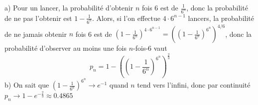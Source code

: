 a) Pour un lancer, la probabilité d'obtenir $n$ fois 6 est de $\frac{1}{6^n}$, donc la probabilité de ne pas l'obtenir est $1-\frac{1}{6^n}$. Alors, si l'on effectue $4\cdot 6^{n-1}$ lancers, la probabilité de ne jamais obtenir $n$ fois 6 est de $\left(1-\frac{1}{6^n}\right)^{4\cdot 6^{n-1}}=\left(\left(1-\frac{1}{6^n}\right)^{6^{n}}\right)^{4/6}$, donc la probabilité d'observer au moins une fois $n$-fois-6 vaut
\[
p_n = 1- \left(\left(1-\frac{1}{6^n}\right)^{6^n}\right)^{\frac{2}{3}}
\]
b) On sait que $\left(1-\frac{1}{6^n}\right)^{6^n}\to e^{-1}$ quand $n$ tend vers l'infini, donc par continuité $p_n\to 1-e^{-\frac{2}{3}}\approx 0.4865$
